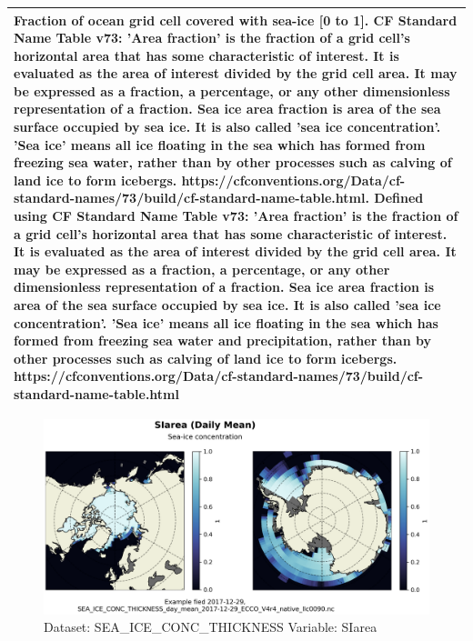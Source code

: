 \begin{longtable}{|m{}|m{}|m{}|m{}|}
\multicolumn{4}{|p{1\textwidth}|}{Fraction of ocean grid cell covered with sea-ice [0 to 1]. CF Standard Name Table v73:  'Area fraction' is the fraction of a grid cell's horizontal area that has some characteristic of interest. It is evaluated as the area of interest divided by the grid cell area. It may be expressed as a fraction, a percentage, or any other dimensionless representation of a fraction. Sea ice area fraction is area of the sea surface occupied by sea ice. It is also called 'sea ice concentration'. 'Sea ice' means all ice floating in the sea which has formed from freezing sea water, rather than by other processes such as calving of land ice to form icebergs. https://cfconventions.org/Data/cf-standard-names/73/build/cf-standard-name-table.html. Defined using CF Standard Name Table v73: 'Area fraction' is the fraction of a grid cell's horizontal area that has some characteristic of interest. It is evaluated as the area of interest divided by the grid cell area. It may be expressed as a fraction, a percentage, or any other dimensionless representation of a fraction. Sea ice area fraction is area of the sea surface occupied by sea ice. It is also called 'sea ice concentration'. 'Sea ice' means all ice floating in the sea which has formed from freezing sea water and precipitation, rather than by other processes such as calving of land ice to form icebergs. https://cfconventions.org/Data/cf-standard-names/73/build/cf-standard-name-table.html} \\ \hline
\end{longtable}

\begin{figure}[H]
\centering
\includegraphics[scale=0.55]{../images/plots/native_plots/Sea-Ice_and_Snow_Concentration_and_Thickness/SIarea.png}
\caption{Dataset: SEA\_ICE\_CONC\_THICKNESS Variable: SIarea}
\label{tab:table-SEA_ICE_CONC_THICKNESS_SIarea-Plot}
\end{figure}
\pagebreak
